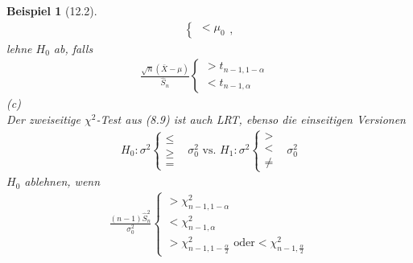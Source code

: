 \documentclass[a4paper,openany]{book}
\theoremstyle{mytheoremstyle}
\newtheorem*{bei}{Beispiel}
\theoremstyle{mytheoremstyle2}
\begin{document}
\begin{bei}[12.2]
\begin{align*}
\begin{cases}
      < \mu _0
    \end{cases},
  \end{align*}
  lehne $H_0$ ab, falls 
  \begin{align*}
    \frac{\sqrt{n}(\bar{X}-\mu )}{\hat{S}_n}\begin{cases}
      >t _{n-1,1-\alpha } &\\
      <t _{n-1,\alpha }
    \end{cases}
  \end{align*}
  (c) \\
  Der zweiseitige $\chi ^2$-Test aus (8.9) ist auch LRT, ebenso die einseitigen Versionen
  \begin{align*}
    H_0:\sigma ^2 \begin{cases}
      \leq  &\\
      \geq  &\\
      =
    \end{cases}\sigma _0^2\text{ vs. }H_1:\sigma ^2 \begin{cases}
      > &\\
      < &\\
      \neq 
    \end{cases}\sigma _0^2
  \end{align*}
  $H_0$ ablehnen, wenn
  \begin{align*}
    \frac{(n-1)\hat{S}_n^2}{\sigma _0^2}\begin{cases}
      > \chi _{n-1,1-\alpha }^2\\
      < \chi _{n-1,\alpha }^2 \\
      > \chi _{n-1,1-\frac{\alpha }{2}}^2 \text{ oder}< \chi _{n-1,\frac{\alpha }{2}}^2
    \end{cases}
  \end{align*}
\end{bei}
\end{document}
